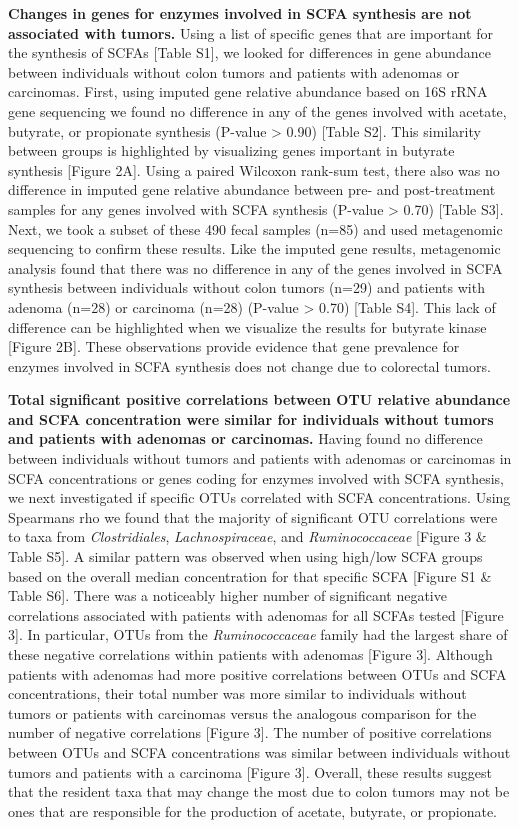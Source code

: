 \documentclass[11pt,]{article}
\begin{document}
\textbf{Changes in genes for enzymes involved in SCFA synthesis are not
associated with tumors.} Using a list of specific genes that are
important for the synthesis of SCFAs {[}Table S1{]}, we looked for
differences in gene abundance between individuals without colon tumors
and patients with adenomas or carcinomas. First, using imputed gene
relative abundance based on 16S rRNA gene sequencing we found no
difference in any of the genes involved with acetate, butyrate, or
propionate synthesis (P-value \textgreater{} 0.90) {[}Table S2{]}. This
similarity between groups is highlighted by visualizing genes important
in butyrate synthesis {[}Figure 2A{]}. Using a paired Wilcoxon rank-sum
test, there also was no difference in imputed gene relative abundance
between pre- and post-treatment samples for any genes involved with SCFA
synthesis (P-value \textgreater{} 0.70) {[}Table S3{]}. Next, we took a
subset of these 490 fecal samples (n=85) and used metagenomic sequencing
to confirm these results. Like the imputed gene results, metagenomic
analysis found that there was no difference in any of the genes involved
in SCFA synthesis between individuals without colon tumors (n=29) and
patients with adenoma (n=28) or carcinoma (n=28) (P-value \textgreater{}
0.70) {[}Table S4{]}. This lack of difference can be highlighted when we
visualize the results for butyrate kinase {[}Figure 2B{]}. These
observations provide evidence that gene prevalence for enzymes involved
in SCFA synthesis does not change due to colorectal tumors.

\textbf{Total significant positive correlations between OTU relative
abundance and SCFA concentration were similar for individuals without
tumors and patients with adenomas or carcinomas.} Having found no
difference between individuals without tumors and patients with adenomas
or carcinomas in SCFA concentrations or genes coding for enzymes
involved with SCFA synthesis, we next investigated if specific OTUs
correlated with SCFA concentrations. Using Spearmans rho we found that
the majority of significant OTU correlations were to taxa from
\emph{Clostridiales}, \emph{Lachnospiraceae}, and \emph{Ruminococcaceae}
{[}Figure 3 \& Table S5{]}. A similar pattern was observed when using
high/low SCFA groups based on the overall median concentration for that
specific SCFA {[}Figure S1 \& Table S6{]}. There was a noticeably higher
number of significant negative correlations associated with patients
with adenomas for all SCFAs tested {[}Figure 3{]}. In particular, OTUs
from the \emph{Ruminococcaceae} family had the largest share of these
negative correlations within patients with adenomas {[}Figure 3{]}.
Although patients with adenomas had more positive correlations between
OTUs and SCFA concentrations, their total number was more similar to
individuals without tumors or patients with carcinomas versus the
analogous comparison for the number of negative correlations {[}Figure
3{]}. The number of positive correlations between OTUs and SCFA
concentrations was similar between individuals without tumors and
patients with a carcinoma {[}Figure 3{]}. Overall, these results suggest
that the resident taxa that may change the most due to colon tumors may
not be ones that are responsible for the production of acetate,
butyrate, or propionate.
\end{document}
